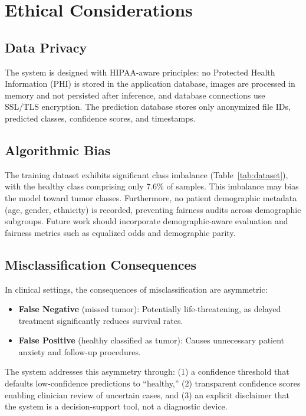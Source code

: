 \documentclass[conference]{IEEEtran}
\begin{document}
\section{Ethical Considerations}
\label{sec:ethics}

\subsection{Data Privacy}
The system is designed with HIPAA-aware principles: no Protected Health Information (PHI) is stored in the application database, images are processed in memory and not persisted after inference, and database connections use SSL/TLS encryption. The prediction database stores only anonymized file IDs, predicted classes, confidence scores, and timestamps.

\subsection{Algorithmic Bias}
The training dataset exhibits significant class imbalance (Table~\ref{tab:dataset}), with the healthy class comprising only 7.6\% of samples. This imbalance may bias the model toward tumor classes. Furthermore, no patient demographic metadata (age, gender, ethnicity) is recorded, preventing fairness audits across demographic subgroups. Future work should incorporate demographic-aware evaluation and fairness metrics such as equalized odds and demographic parity.

\subsection{Misclassification Consequences}
In clinical settings, the consequences of misclassification are asymmetric:
\begin{itemize}
    \item \textbf{False Negative} (missed tumor): Potentially life-threatening, as delayed treatment significantly reduces survival rates.
    \item \textbf{False Positive} (healthy classified as tumor): Causes unnecessary patient anxiety and follow-up procedures.
\end{itemize}

The system addresses this asymmetry through: (1) a confidence threshold that defaults low-confidence predictions to ``healthy,'' (2) transparent confidence scores enabling clinician review of uncertain cases, and (3) an explicit disclaimer that the system is a decision-support tool, not a diagnostic device.
\end{document}
